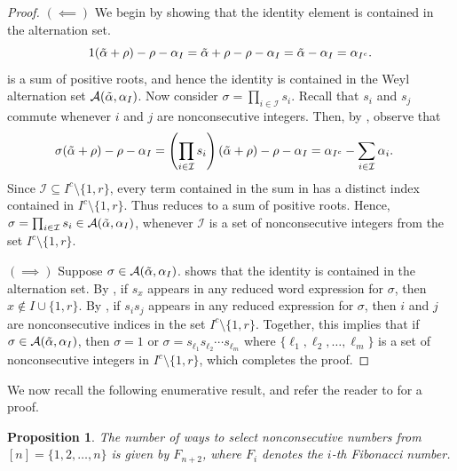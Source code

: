 \documentclass[10pt]{article}
\newtheorem{proposition}[theorem]{Proposition}
\newcommand{\hr}[0]{\Tilde{\alpha}}
\newcommand{\newmu}[0]{\alpha_I}
\newcommand{\thealtset}[0]{\mathcal{A}(\hr,\newmu)}
\begin{document}
\begin{proof}
    $(\impliedby)$ We begin by showing that the identity element is contained in the alternation set.
    \begin{equation}
        1(\hr+\rho)-\rho-\alpha_I = \hr + \rho -\rho - \alpha_I = \hr -\alpha_I=\alpha_{I^c}.\label{eq: identity case}
    \end{equation} 
     is a sum of positive roots, and hence the identity is contained in the Weyl alternation set $\thealtset$.
    Now consider 
$\sigma=\prod_{i\in\mathcal{I}}s_i$. 
Recall that $s_i$ and $s_j$ commute whenever $i$ and $j$ are nonconsecutive integers. 
Then, by , observe that
    \begin{align}
        \sigma(\hr+\rho)-\rho-\alpha_I=\left(\prod_{i\in\mathcal{I}}s_i\right)(\hr+\rho)-\rho-\alpha_I&= 
        \alpha_{I^c} -\sum_{i\in\mathcal{I}}\alpha_{i}.\label{eq: double sum}
    \end{align}
    Since $\mathcal{I}\subseteq I^c\setminus\{1,r\}$, every term contained in the sum in  has a distinct index contained in $I^c\setminus\{1,r\}$. Thus 
    reduces to a sum of positive roots. 
    Hence, $\sigma=\prod_{i\in\mathcal{I}}s_i\in\mathcal{A}(\hr,\alpha_I)$, whenever $\mathcal{I}$ is a set of nonconsecutive integers from the set $I^c\setminus\{1,r\}$.
    
 $(\implies)$
    Suppose $\sigma\in\mathcal{A}(\hr,\alpha_I)$.  shows that the identity is contained in the alternation set. 
    By , if $s_x$ appears in any reduced word expression for $\sigma$, then $x\notin I\cup\{1,r\}$. 
    By , if 
    $s_is_j$ appears in any reduced expression for $\sigma$, then $i$ and $j$ are nonconsecutive indices in the set $I^c\setminus\{1,r\}$. 
    Together, this implies that if $\sigma\in\thealtset$, then $\sigma=1$ or $\sigma=s_{\ell_1}s_{\ell_2}\cdots s_{\ell_m}$  where $\{\ell_1,\ell_2,\ldots,\ell_m\}$ is a set of nonconsecutive integers in $I^c\setminus\{1,r\}$, which completes the proof.   
\end{proof}
We now recall the following enumerative result, and refer the reader to \cite[Proposition 2.3]{harry2024computingqmultiplicitypositiveroots} for a proof. 
\begin{proposition}\label{prop: count is Fibonacci}
    The number of ways to select nonconsecutive numbers from $[n]=\{1,2,\ldots,n\}$ is given by $F_{n+2}$, where $F_i$ denotes the $i$-th Fibonacci number.
\end{proposition}
\end{document}

